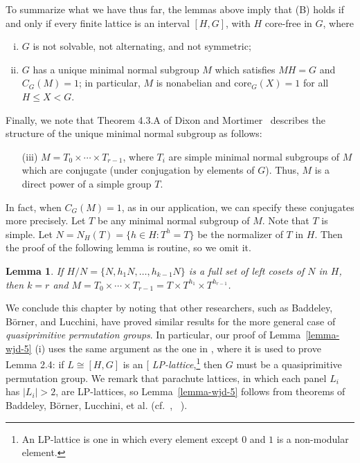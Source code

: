 \documentclass[cm,dissertation,actual,final]{uhthesis}
\theoremstyle{plain}
\newtheorem{lemma}[theorem]{Lemma}
\theoremstyle{definition}
\theoremstyle{remark}
\numberwithin{theorem}{section}
\numberwithin{claim}{chapter}
\numberwithin{equation}{section}
\numberwithin{conjecture}{chapter}
\newcommand{\<}{\ensuremath{\langle}}
\renewcommand{\>}{\ensuremath{\rangle}}
\renewcommand{\leq}{\ensuremath{\leqslant}}
\newcommand{\core}{\ensuremath{\mathrm{core}}}
\newcommand{\0}{\ensuremath{\mathbf{0}}}
\newcommand{\1}{\ensuremath{\mathbf{1}}}
\newcommand{\2}{\ensuremath{\mathbf{2}}}
\newcommand{\3}{\ensuremath{\mathbf{3}}}
\newcommand{\4}{\ensuremath{\mathbf{4}}}
\newcommand{\5}{\ensuremath{\mathbf{5}}}
\newcommand{\indexit}[1]{\index{#1|textit}}
\def\defn#1{\gdef\defnstring{#1}%
  \xdef\dodefnii{{\noexpand\em
       \defnstring}\noexpand\indexit{\defnstring}\noexpand\makeatother}%
  \futurelet\nextthing\dodefn}
\def\dodefn{%
  \ifx\nextthing[\let\next=\dodefni
    \else\let\next=\dodefnii\fi
  \makeatletter
  \next}
\def\dodefni[#1]{%
  {\em\defnstring}%
  \indexit{#1}%
  \makeatother}
\begin{document}
To summarize what we have thus far, the lemmas above imply that (B) holds if and only if
every finite lattice is an interval $[H, G]$, with $H$ core-free in $G$, where
\begin{enumerate}[(i)]
\item $G$ is not solvable, not alternating, and not symmetric;
\item $G$ has a unique minimal normal subgroup $M$ which satisfies $MH = G$
and $C_G(M) = 1$; in particular,
$M$ is nonabelian and $\core_G(X) = 1$ for all $H\leq X < G$.
\end{enumerate}

Finally, we note that Theorem 4.3.A of Dixon and Mortimer~\cite{Dixon:1996}
describes the structure of the unique minimal normal subgroup as follows:
\begin{enumerate}[(i)]
\item[(iii)] $M = T_0\times \cdots \times T_{r-1}$, where $T_i$ are simple minimal normal subgroups of
  $M$ which are conjugate (under conjugation by elements of $G$). Thus, $M$ is a
  direct power of a simple group $T$.
\end{enumerate}
  In fact, when $C_G(M)=1$, as in our application,
we can specify these conjugates more precisely. %
Let $T$ be any minimal normal subgroup of $M$. Note that $T$ is simple.
Let $N = N_H(T) = \{h\in H : T^h = T\}$ be the normalizer of $T$ in
$H$.  Then the proof of the following lemma is routine, so we omit it.
\begin{lemma}
If $H/N = \{N, h_1N, \dots, h_{k-1}N\}$ is a full set of left cosets of $N$
in $H$, then $k=r$ and $M = T_0\times \cdots \times T_{r-1} = T \times
T^{h_1} \times T^{h_{r-1}}$. 
\end{lemma}

We conclude this chapter by noting that other researchers, such as Baddeley,
B\"orner, and Lucchini, have proved similar results 
for the more general case of \emph{quasiprimitive permutation groups}. 
In particular, our proof of Lemma~\ref{lemma-wjd-5} (i) uses the same argument
as the one in \cite{Borner:1999}, where it is used to prove Lemma 2.4: if $L
\cong [H, G]$ is an \defn{LP-lattice},\footnote{An LP-lattice is one in which
  every element except $0$ and $1$ is a non-modular element.}
then $G$ must be a quasiprimitive permutation 
group.  
We remark that parachute lattices, in which each panel
 $L_i$ has $|L_i|>2$, are LP-lattices, so
Lemma~\ref{lemma-wjd-5} follows from
theorems of Baddeley, B\"orner, Lucchini, et al. 
(cf.~\cite{Lucchini:1997}, ~\cite{Borner:1999}).
\end{document}
